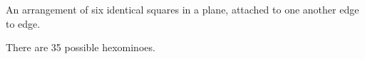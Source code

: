 An arrangement of six identical squares in a plane, 
attached to one another edge to edge.
\par
There are 35 possible hexominoes.
